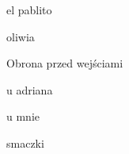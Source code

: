 \documentclass[12pt, a4paper]{article}
\begin{document}
el pablito
\begin{center}
    \qquad
\end{center}

oliwia
\begin{center}
    \qquad
\end{center}


Obrona przed wejściami

u adriana
\begin{center}
    \qquad
\end{center}

u mnie
\begin{center}
    \qquad
\end{center}


smaczki
\begin{center}
    \qquad
\end{center}
\end{document}
